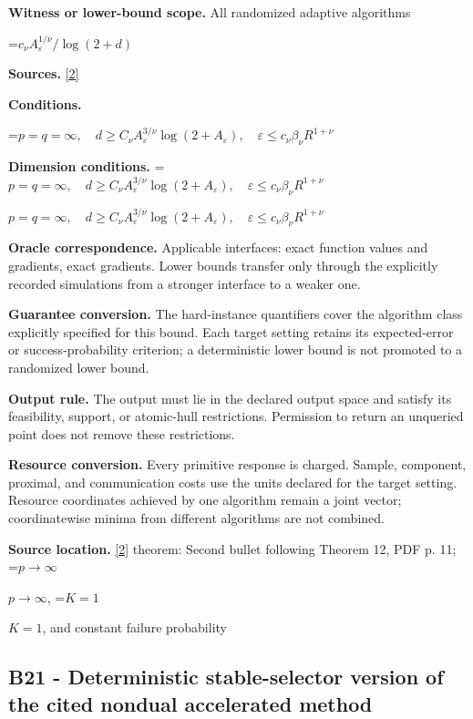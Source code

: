 \documentclass[10pt,a4paper]{article}
\newcommand{\AtlasMath}[1]{\par\begingroup\centering\setbox0=\hbox{$\displaystyle #1$}\ifdim\wd0>1.4\linewidth\typeout{ATLAS WIDE FORMULA: \the\wd0}\fi\ifdim\wd0>\linewidth\resizebox{\linewidth}{!}{\box0}\else\box0\fi\par\endgroup}
\newcommand{\AtlasInlineMath}[1]{\begingroup\setbox0=\hbox{$#1$}\ifdim\wd0>.4\linewidth\endgroup\AtlasMath{#1}\else\endgroup$#1$\fi}
\begin{document}
\textbf{Witness or lower-bound scope.} All randomized adaptive algorithms



\AtlasMath{c_\nu A_\varepsilon^{1/\nu}/\log(2+d)}


\textbf{Sources.} \href{https://proceedings.mlr.press/v99/diakonikolas19c/diakonikolas19c.pdf}{[2]}



\textbf{Conditions.}
\AtlasMath{p=q=\infty,\quad d\ge C_\nu A_\varepsilon^{3/\nu}\log(2+A_\varepsilon),\quad\varepsilon\le c_\nu\beta_\nu R^{1+\nu}}




\textbf{Dimension conditions.} \AtlasInlineMath{p=q=\infty,\quad d\ge C_\nu A_\varepsilon^{3/\nu}\log(2+A_\varepsilon),\quad\varepsilon\le c_\nu\beta_\nu R^{1+\nu}}



\textbf{Oracle correspondence.} Applicable interfaces: exact function values and gradients, exact gradients. Lower bounds transfer only through the explicitly recorded simulations from a stronger interface to a weaker one.



\textbf{Guarantee conversion.} The hard-instance quantifiers cover the algorithm class explicitly specified for this bound. Each target setting retains its expected-error or success-probability criterion; a deterministic lower bound is not promoted to a randomized lower bound.



\textbf{Output rule.} The output must lie in the declared output space and satisfy its feasibility, support, or atomic-hull restrictions. Permission to return an unqueried point does not remove these restrictions.



\textbf{Resource conversion.} Every primitive response is charged. Sample, component, proximal, and communication costs use the units declared for the target setting. Resource coordinates achieved by one algorithm remain a joint vector; coordinatewise minima from different algorithms are not combined.



\textbf{Source location.} \href{https://proceedings.mlr.press/v99/diakonikolas19c/diakonikolas19c.pdf}{[2]} theorem: Second bullet following Theorem 12, PDF p. 11; \AtlasInlineMath{p\to\infty}, \AtlasInlineMath{K=1}, and constant failure probability



\subsection{B21 - Deterministic stable-selector version of the cited nondual accelerated method}
\end{document}
